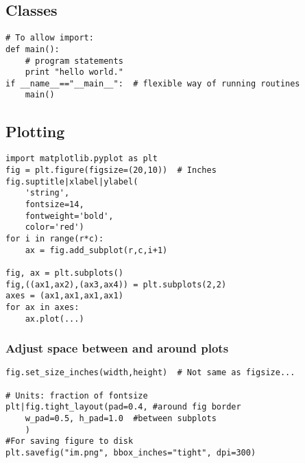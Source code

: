 \documentclass{article}
\begin{document}
\begin{multicols}{2}
\subsection{Classes}
\begin{lstlisting}
# To allow import:
def main():
    # program statements
    print "hello world."
if __name__=="__main__":  # flexible way of running routines
    main()
\end{lstlisting}

\newpage

\newpage
\subsection{Plotting}
\begin{lstlisting}
import matplotlib.pyplot as plt
fig = plt.figure(figsize=(20,10))  # Inches
fig.suptitle|xlabel|ylabel(
    'string',
    fontsize=14,
    fontweight='bold',
    color='red')
for i in range(r*c):
    ax = fig.add_subplot(r,c,i+1)

fig, ax = plt.subplots()
fig,((ax1,ax2),(ax3,ax4)) = plt.subplots(2,2)
axes = (ax1,ax1,ax1,ax1)
for ax in axes:
    ax.plot(...)
\end{lstlisting}

\subsubsection{Adjust space between and around plots}
\begin{lstlisting}
fig.set_size_inches(width,height)  # Not same as figsize...

# Units: fraction of fontsize
plt|fig.tight_layout(pad=0.4, #around fig border
    w_pad=0.5, h_pad=1.0  #between subplots
    )
#For saving figure to disk
plt.savefig("im.png", bbox_inches="tight", dpi=300)
\end{lstlisting}


\end{multicols}
\end{document}
